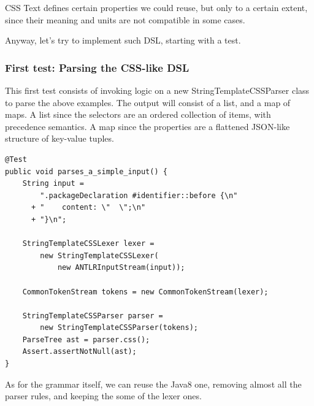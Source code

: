 \documentclass[11pt]{article}
\begin{document}
CSS Text defines certain properties we could reuse, but only to a certain extent, since their meaning and units are
not compatible in some cases.

Anyway, let's try to implement such DSL, starting with a test.

\subsubsection{First test: Parsing the CSS-like DSL}
\label{sec-1-4-2}

This first test consists of invoking logic on a new StringTemplateCSSParser class to parse the above examples. The output
will consist of a list, and a map of maps. A list since the selectors are an ordered collection of items, with precedence semantics.
A map since the properties are a flattened JSON-like structure of key-value tuples.

\begin{verbatim}
@Test
public void parses_a_simple_input() {
    String input =
        ".packageDeclaration #identifier::before {\n"
      + "    content: \"  \";\n"
      + "}\n";

    StringTemplateCSSLexer lexer =
        new StringTemplateCSSLexer(
            new ANTLRInputStream(input));

    CommonTokenStream tokens = new CommonTokenStream(lexer);

    StringTemplateCSSParser parser =
        new StringTemplateCSSParser(tokens);
    ParseTree ast = parser.css();
    Assert.assertNotNull(ast);
}
\end{verbatim}

As for the grammar itself, we can reuse the Java8 one, removing almost all the parser rules, and keeping the some of the lexer
ones.
\end{document}
